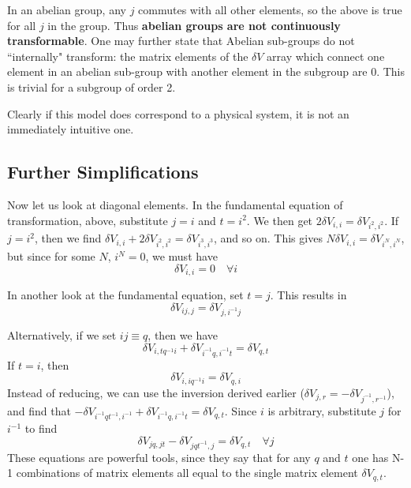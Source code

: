\documentclass[12pt]{article}
\begin{document}
 In an abelian group, any $j$ commutes with all other elements, so the above
is true for all $j$ in the group.  Thus
{\bf abelian groups are not continuously transformable}.  One 
may further state that
Abelian sub-groups do not ``internally" transform:  the matrix elements
of the $\delta V$ array which connect one element in an abelian sub-group
with another element in the subgroup are 0.
This is trivial for a subgroup of order 2.

 Clearly if this model does correspond to a physical system, it is not
an immediately intuitive one.

\subsection{ Further Simplifications}
 Now let us look at diagonal elements.  In the fundamental equation of
transformation, above, substitute $j=i$ and $t=i^2$.  We then get
$2\delta V_{i,i} = \delta V_{i^2,i^2}$.  If $j=i^2$, then we find
$\delta V_{i,i} + 2\delta V_{i^2,i^2} = \delta V_{i^3,i^3}$, and so
on.  This gives $N\delta V_{i,i} = \delta V_{i^N,i^N}$, but since
for some $N$, $i^N =0$, we must have
\begin{equation}
\delta V_{i,i} = 0 \quad \forall i
\end{equation}

 In another look at the fundamental equation, set $t=j$.  This results in
\begin{equation}
\delta V_{ij,j} = \delta V_{j,i^{-1}j}
\end{equation}

 Alternatively, if we set $ij \equiv q$, then we have 
\begin{equation}
\delta V_{i,tq^{-1}i} + \delta V_{i^{-1}q,i^{-1}t} = \delta V_{q,t}
\end{equation}
If $t = i$, then
\begin{equation}
\delta V_{i,iq^{-1}i} = \delta V_{q,i}
\end{equation}
Instead of reducing, we can use the inversion derived earlier ($\delta V_{j,r} =
-\delta V_{j^{-1},r^{-1}}$), and find that
$-\delta V_{i^{-1}qt^{-1},i^{-1}} + \delta V_{i^{-1}q,i^{-1}t} = \delta V_{q,t}$.
Since $i$ is arbitrary, 
substitute $j$ for $i^{-1}$ to find
\begin{equation}
\delta V_{jq,jt} - \delta V_{jqt^{-1},j} = \delta V_{q,t} \quad \forall j
\end{equation}
These equations are powerful tools, since they say that for any $q$ and
$t$ one has N-1 combinations of matrix elements all equal to the single
matrix element $\delta V_{q,t}$.
\end{document}
